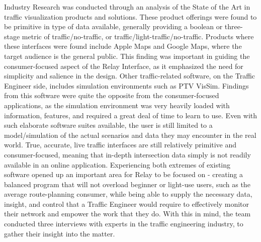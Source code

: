 \documentclass{report}
\begin{document}
Industry Research was conducted through an analysis of the State of the Art in traffic visualization products and solutions. 
These product offerings were found to be primitive in type of data available, generally providing a boolean or three-stage metric of traffic/no-traffic, or traffic/light-traffic/no-traffic.
Products where these interfaces were found include Apple Maps and Google Maps, where the target audience is the general public. 
This finding was important in guiding the consumer-focused aspect of the Relay Interface, as it emphasized the need for simplicity and salience in the design.
Other traffic-related software, on the Traffic Engineer side, includes simulation environments such as PTV VisSim.
Findings from this software were quite the opposite from the consumer-focused applications, as the simulation environment was very heavily loaded with information, features, and required a great deal of time to learn to use.
Even with such elaborate software suites available, the user is still limited to a model/simulation of the actual scenarios and data they may encounter in the real world.
True, accurate, live traffic interfaces are still relatively primitive and consumer-focused, meaning that in-depth intersection data simply is not readily available in an online application.
Experiencing both extremes of existing software opened up an important area for Relay to be focused on - creating a balanced program that will not overload beginner or light-use users, such as the average route-planning consumer, while being able to supply the necessary data, insight, and control that a Traffic Engineer would require to effectively monitor their network and empower the work that they do.
With this in mind, the team conducted three interviews with experts in the traffic engineering industry, to gather their insight into the matter.
\end{document}
